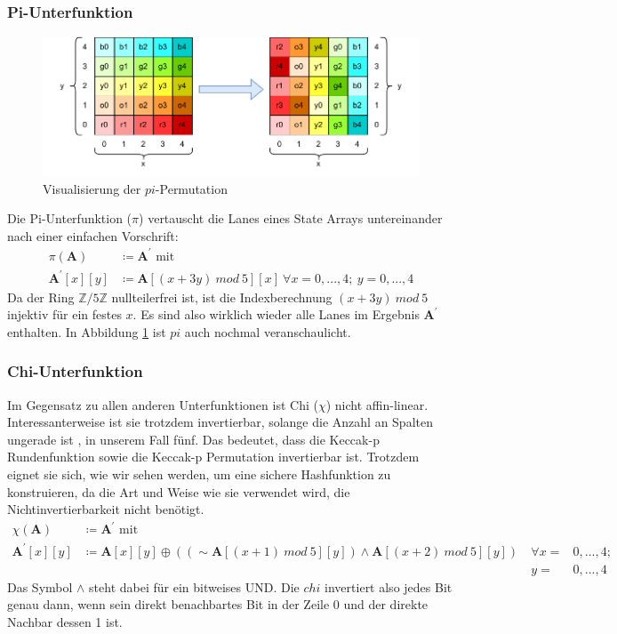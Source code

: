 \subsubsection{Pi-Unterfunktion}
\begin{figure}
    \center
    \includegraphics{images/pi.pdf}
    \caption{Visualisierung der $pi$-Permutation}
    \label{fig:definition_pi}
\end{figure}
Die Pi-Unterfunktion ($\pi$) vertauscht die Lanes eines State Arrays untereinander nach einer einfachen Vorschrift:
\begin{align*}
    \pi (\textbf{A}) & \coloneq \textbf{A}^\prime \text{ mit } \\
    \textbf{A}^\prime[x][y] & \coloneq \textbf{A}[(x + 3y)\ mod\ 5][x]\ \forall x = 0,...,4;\ y = 0,...,4
\end{align*}
Da der Ring $\mathbb{Z}/5\mathbb{Z}$ nullteilerfrei ist, ist die Indexberechnung $(x + 3y)\ mod\ 5$ injektiv für ein festes $x$.
Es sind also wirklich wieder alle Lanes im Ergebnis $\textbf{A}^\prime$ enthalten. In Abbildung \ref{fig:definition_pi} ist $pi$
auch nochmal veranschaulicht.

\subsubsection{Chi-Unterfunktion}
Im Gegensatz zu allen anderen Unterfunktionen ist Chi ($\chi$) nicht affin-linear.
Interessanterweise ist sie trotzdem invertierbar, solange die Anzahl an Spalten ungerade ist \cite{Daemen1995CipherAH}, in unserem Fall fünf. 
Das bedeutet, dass die Keccak-p Rundenfunktion sowie die Keccak-p Permutation invertierbar ist.
Trotzdem eignet sie sich, wie wir sehen werden, um eine sichere Hashfunktion zu konstruieren,
da die Art und Weise wie sie verwendet wird, die Nichtinvertierbarkeit nicht benötigt.
\begin{align*}
    \chi (\textbf{A}) & \coloneq \textbf{A}^\prime \text{ mit } \\
    \textbf{A}^\prime[x][y] & \coloneq \textbf{A}[x][y] \oplus ((\sim \textbf{A}[(x + 1)\ mod\ 5][y]) \wedge \textbf{A}[(x + 2)\ mod\ 5][y])\ & \forall x = & 0,...,4;\\
    && y = & 0,...,4
\end{align*}
Das Symbol $\wedge$ steht dabei für ein bitweises UND.
Die $chi$ invertiert also jedes Bit genau dann, wenn sein direkt benachbartes Bit in der Zeile 0 und der direkte Nachbar dessen 1 ist.

